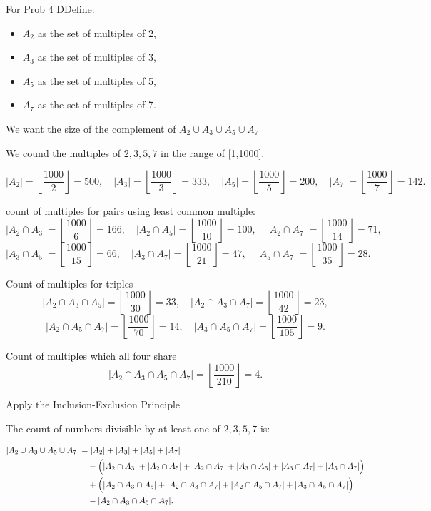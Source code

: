 \documentclass{report}
\begin{document}
\begin{RemarkWithLily}{For Prob 4}
  DDefine:

  \begin{itemize}
      \item \(A_2\) as the set of multiples of 2,
      \item \(A_3\) as the set of multiples of 3,
      \item \(A_5\) as the set of multiples of 5,
      \item \(A_7\) as the set of multiples of 7.
  \end{itemize}
  
  We want the size of the complement of \(A_2 \cup A_3 \cup A_5 \cup A_7\)
  
  We cound the multiples of \(2,3,5,7 \) in the range of [1,1000].

  \[
  |A_2| = \left\lfloor \frac{1000}{2} \right\rfloor = 500, \quad 
  |A_3| = \left\lfloor \frac{1000}{3} \right\rfloor = 333, \quad 
  |A_5| = \left\lfloor \frac{1000}{5} \right\rfloor = 200, \quad 
  |A_7| = \left\lfloor \frac{1000}{7} \right\rfloor = 142.
  \]
  
  count of multiples for pairs using least common multiple:
  \[
  |A_2 \cap A_3| = \left\lfloor \frac{1000}{6} \right\rfloor = 166, \quad
  |A_2 \cap A_5| = \left\lfloor \frac{1000}{10} \right\rfloor = 100, \quad
  |A_2 \cap A_7| = \left\lfloor \frac{1000}{14} \right\rfloor = 71, \] 
  \[ 
  |A_3 \cap A_5| = \left\lfloor \frac{1000}{15} \right\rfloor = 66, \quad
  |A_3 \cap A_7| = \left\lfloor \frac{1000}{21} \right\rfloor = 47, \quad
  |A_5 \cap A_7| = \left\lfloor \frac{1000}{35} \right\rfloor = 28.
  \]
  
  Count of multiples for triples
  \[
  |A_2 \cap A_3 \cap A_5| = \left\lfloor \frac{1000}{30} \right\rfloor = 33, \quad
  |A_2 \cap A_3 \cap A_7| = \left\lfloor \frac{1000}{42} \right\rfloor = 23, \] 
  \[ 
  |A_2 \cap A_5 \cap A_7| = \left\lfloor \frac{1000}{70} \right\rfloor = 14, \quad
  |A_3 \cap A_5 \cap A_7| = \left\lfloor \frac{1000}{105} \right\rfloor = 9.
  \]
  
  Count of multiples which all four share 
  \[
  |A_2 \cap A_3 \cap A_5 \cap A_7| = \left\lfloor \frac{1000}{210} \right\rfloor = 4.
  \]
  
  Apply the Inclusion-Exclusion Principle
  
  The count of numbers divisible by at least one of \(2,3,5,7\) is:
  
  \[
  \begin{aligned}
  |A_2 \cup A_3 \cup A_5 \cup A_7| &= |A_2|+|A_3|+|A_5|+|A_7| \\
  &\quad - \Bigl(|A_2 \cap A_3| + |A_2 \cap A_5| + |A_2 \cap A_7| + |A_3 \cap A_5| + |A_3 \cap A_7| + |A_5 \cap A_7|\Bigr)\\
  &\quad + \Bigl(|A_2 \cap A_3 \cap A_5| + |A_2 \cap A_3 \cap A_7| + |A_2 \cap A_5 \cap A_7| + |A_3 \cap A_5 \cap A_7|\Bigr)\\
  &\quad - |A_2 \cap A_3 \cap A_5 \cap A_7|.
  \end{aligned}
  \]
  

\end{RemarkWithLily}
\end{document}
